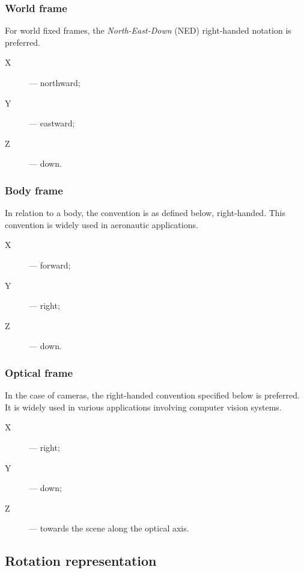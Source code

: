 \subsubsection{World frame}

For world fixed frames, the \emph{North-East-Down} (NED) right-handed notation is preferred.
\begin{samepage}
    \begin{description}
        \item[X] --- northward;
        \item[Y] --- eastward;
        \item[Z] --- down.
    \end{description}
\end{samepage}

\subsubsection{Body frame}

In relation to a body, the convention is as defined below, right-handed.
This convention is widely used in aeronautic applications.
\begin{samepage}
    \begin{description}
        \item[X] --- forward;
        \item[Y] --- right;
        \item[Z] --- down.
    \end{description}
\end{samepage}

\subsubsection{Optical frame}

In the case of cameras, the right-handed convention specified below is preferred.
It is widely used in various applications involving computer vision systems.
\begin{samepage}
    \begin{description}
        \item[X] --- right;
        \item[Y] --- down;
        \item[Z] --- towards the scene along the optical axis.
    \end{description}
\end{samepage}

\subsection{Rotation representation}

